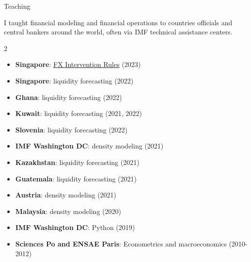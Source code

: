 \documentclass[usegeometry, 10pt, a4paper]{cv} %
\begin{document}
\begin{rubriquetableau}[0.95\textwidth]{Teaching}

  I taught financial modeling and financial operations to countries officials and central bankers around the world, often via IMF technical assistance centers. \\
  
  \begin{multicols}{2}
  
  \begin{itemize}
  \item \textbf{Singapore}: \href{https://romainlafarguette.github.io/fxinterventions/docs/index.html}{FX Intervention Rules} (2023)    
  \item \textbf{Singapore}: liquidity forecasting (2022)
  \item \textbf{Ghana}: liquidity forecasting (2022)
  \item \textbf{Kuwait}: liquidity forecasting (2021, 2022)
  \item \textbf{Slovenia}: liquidity forecasting (2022)
  \item \textbf{IMF Washington DC}: density modeling (2021)
  \item \textbf{Kazakhstan}: liquidity forecasting (2021)
  \item \textbf{Guatemala}: liquidity forecasting (2021)
  \item \textbf{Austria}: density modeling (2021)
  \item \textbf{Malaysia}: density modeling (2020)
  \item \textbf{IMF Washington DC}: Python (2019)
  \item \textbf{Sciences Po and ENSAE Paris}: Econometrics and macroeconomics (2010-2012)
  \end{itemize}
  
  \end{multicols}
\end{rubriquetableau}




\end{document}
